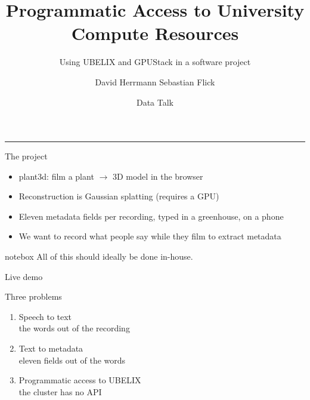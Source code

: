 \documentclass[aspectratio=169,11pt]{beamer}
\title{Programmatic Access to University Compute Resources}
\subtitle{Using UBELIX and GPUStack in a software project}
\author{David Herrmann \quad\textbar\quad Sebastian Flick}
\institute{Data Science Lab, University of Bern}
\date{Data Talk}
\newenvironment{notebox}
  {\begin{beamercolorbox}[wd=\dimexpr\textwidth-16pt\relax,sep=8pt]{notebox}\small}
  {\end{beamercolorbox}}
\newcommand{\key}[1]{{\color{ubBlue}\ttfamily #1}}
\begin{document}
\begin{frame}[plain]
  \vspace{1.2em}
  {\color{ubRed}\rule{4em}{3pt}}\par
  \vspace{0.8em}
  {\color{white}\inserttitle}\par
  \vspace{0.7em}
  {\color{ubText}\large\insertsubtitle}\par
  \vspace{1.6em}
  {\color{ubText}\insertauthor}\par
  \vspace{0.3em}
  {\color{ubMuted}\small\insertinstitute}\par
  \vspace{0.2em}
  {\color{ubMuted}\small\insertdate}
\end{frame}

\begin{frame}{The project}
  \begin{itemize}\setlength\itemsep{0.7em}
    \item \key{plant3d}: film a plant $\rightarrow$ 3D model in the browser
    \item Reconstruction is Gaussian splatting (requires a GPU)
    \item Eleven metadata fields per recording, typed in a greenhouse, on a phone
    \item We want to record what people say while they film to extract metadata
  \end{itemize}
  \vspace{1.1em}
  \begin{notebox}
    All of this should ideally be done in-house.
  \end{notebox}
\end{frame}

\begin{frame}{Live demo}

\end{frame}
\begin{frame}{Three problems}
  \begin{enumerate}\setlength\itemsep{1.0em}
    \item Speech to text\\
      {\small\color{ubMuted}the words out of the recording}
    \item Text to metadata\\
      {\small\color{ubMuted}eleven fields out of the words}
    \item Programmatic access to UBELIX\\
      {\small\color{ubMuted}the cluster has no API}
  \end{enumerate}
\end{frame}
\end{document}
